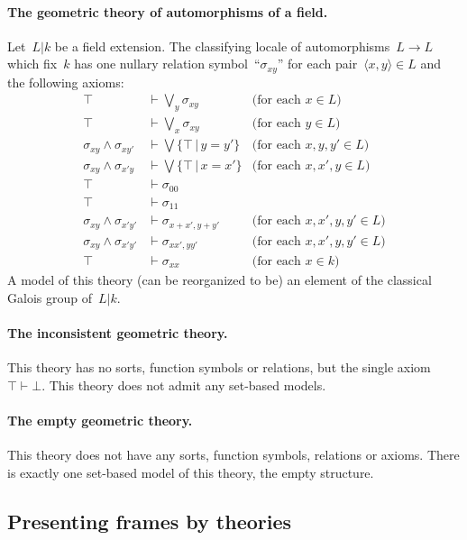 \documentclass{ws-rv9x6}
\renewcommand{\_}{\mathpunct{.}}
\newcommand{\?}{\,{:}\,}
\begin{document}
\paragraph{The geometric theory of automorphisms of a field.}\label{par:theory-automorphisms}
Let~$L|k$ be a field
extension. The classifying locale of automorphisms~$L \to L$ which fix~$k$ has
one nullary relation symbol~``$\sigma_{xy}$'' for each pair~$\langle x,y
\rangle \in L$ and the following axioms:
\begin{align*}
  \top &\vdash \bigvee_y \sigma_{xy} & \text{(for each~$x \in L$)} \\
  \top &\vdash \bigvee_x \sigma_{xy} & \text{(for each~$y \in L$)} \\
  \sigma_{xy} \wedge \sigma_{xy'} &\vdash \bigvee\{ \top \,|\, y = y' \} & \text{(for each~$x,y,y' \in L$)} \\
  \sigma_{xy} \wedge \sigma_{x'y} &\vdash \bigvee\{ \top \,|\, x = x' \} & \text{(for each~$x,x',y \in L$)} \\
  \top &\vdash \sigma_{00} \\
  \top &\vdash \sigma_{11} \\
  \sigma_{xy} \wedge \sigma_{x'y'} &\vdash \sigma_{x+x',y+y'} & \text{(for each~$x,x',y,y' \in L$)} \\
  \sigma_{xy} \wedge \sigma_{x'y'} &\vdash \sigma_{xx',yy'} & \text{(for each~$x,x',y,y' \in L$)} \\
  \top &\vdash \sigma_{xx} & \text{(for each~$x \in k$)}
\end{align*}
A model of this theory (can be reorganized to be) an element of the classical
Galois group of~$L|k$.

\paragraph{The inconsistent geometric theory.} This theory has no sorts,
function symbols or relations, but the single axiom $\top \vdash \bot$.
This theory does not admit any set-based models.

\paragraph{The empty geometric theory.} This theory does not have any sorts,
function symbols, relations or axioms. There is exactly one set-based model of
this theory, the empty structure.


\subsection{Presenting frames by theories}
\label{sect:presenting-frames}
\end{document}
